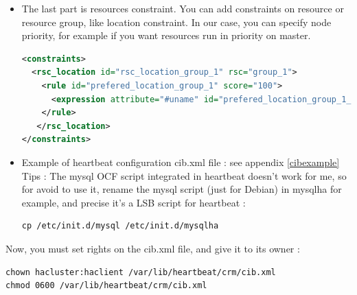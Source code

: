 \documentclass[a4paper,10pt]{report}
\begin{document}
\begin{itemize}
\begin{itemize}
\end{itemize}

\item The last part is resources constraint. You can add constraints on resource or resource group, like location constraint.
In our case, you can specify node priority, for example if you want resources run in priority on master.
\begin{lstlisting}[language=xml]
<constraints>
  <rsc_location id="rsc_location_group_1" rsc="group_1">
    <rule id="prefered_location_group_1" score="100">
      <expression attribute="#uname" id="prefered_location_group_1_expr" operation="eq" value="NODE-NAME"/>
    </rule>
   </rsc_location>
</constraints>
\end{lstlisting}

\item Example of heartbeat configuration cib.xml file : see appendix \ref{cibexample}\\

Tips : The mysql OCF script integrated in heartbeat doesn't work for me, so for avoid to use it, rename the mysql script (just for Debian) in mysqlha for example, and precise it's a LSB script for heartbeat :
\begin{lstlisting}
cp /etc/init.d/mysql /etc/init.d/mysqlha
\end{lstlisting}


\end{itemize}

Now, you must set rights on the cib.xml file, and give it to its owner :
\begin{lstlisting}
chown hacluster:haclient /var/lib/heartbeat/crm/cib.xml
chmod 0600 /var/lib/heartbeat/crm/cib.xml
\end{lstlisting}
\end{document}
